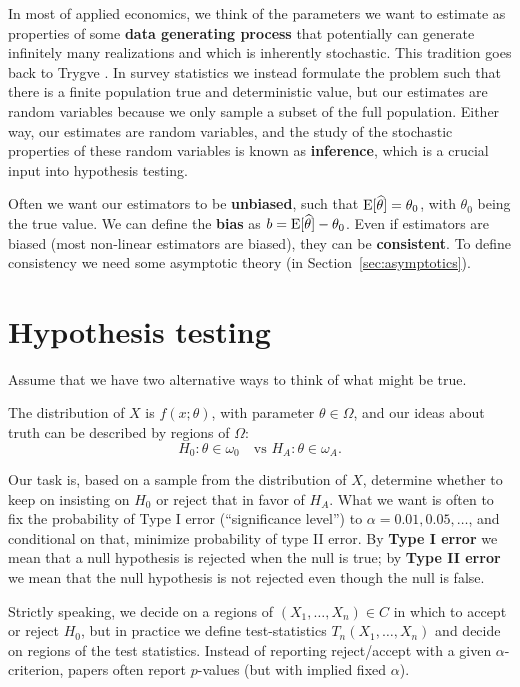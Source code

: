 \documentclass[twoside]{article}
\begin{document}
In most of applied economics, we think of the parameters we want to estimate as properties
of some \textbf{data generating process} that potentially can generate infinitely many realizations and
which is inherently stochastic. This tradition goes back to Trygve \citet{Haavelmo1944}.
In survey statistics we instead formulate the problem such that there is a finite population true and
deterministic value, but our estimates are random variables because we only sample a subset of the
full population. Either way, our estimates are random variables, and the study of the stochastic
properties of these random variables is known as \textbf{inference}, which is a crucial input
into hypothesis testing. 

Often we want our estimators to be \textbf{unbiased}, such that
$\operatorname{E}[\widehat{\theta}]=\theta_0$, with $\theta_0$ being the true value. We can
define the \textbf{bias} as $b=\operatorname{E}[\widehat{\theta}] -\theta_0$. Even if
estimators are biased (most non-linear estimators are biased), they can be
\textbf{consistent}. To define consistency we need some asymptotic theory (in
Section~\ref{sec:asymptotics}).

\section{Hypothesis testing}
Assume that we have two alternative ways to think of what might
be true.

The distribution of $X$ is $f(x;\theta)$, with parameter
$\theta\in\Omega$, and our ideas about truth can be described by
regions of $\Omega$:
\[ H_0: \theta\in\omega_0 \quad \text{vs $H_{\!A}: \theta\in\omega_A$.}
\]

Our task is, based on a sample from the distribution of $X$, determine
whether to keep on insisting on $H_0$ or reject that in favor of
$H_{\!A}$. What we want is often to fix the probability of Type I error
(``significance level'') to $\alpha=0.01,0.05,\dots$, and conditional
on that, minimize probability of type II error. By \textbf{Type I error} we mean that
a null hypothesis is rejected when the null is true; by \textbf{Type II error} we mean
that the null hypothesis is not rejected even though the null is false.

Strictly speaking, we decide on a regions of $(X_1,\dots,X_n)\in C$ in which to
accept or reject $H_0$, but in practice we define test-statistics
$T_n(X_1,\dots,X_n)$ and decide on regions of the test statistics. Instead of
reporting reject/accept with a given $\alpha$-criterion, papers often report
$p$-values (but with implied fixed $\alpha$). 
\end{document}
